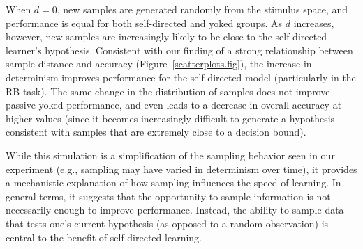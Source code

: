 \documentclass[3p,twocolumn,authoryear,10pt]{elsarticle}
\begin{document}
When $d=0$, new samples are generated randomly from the stimulus space, and performance is equal for both self-directed and yoked groups. As $d$ increases, however, new samples are increasingly likely to be close to the self-directed learner's hypothesis. Consistent with our finding of a strong relationship between sample distance and accuracy (Figure~\ref{scatterplots.fig}), the increase in determinism improves performance for the self-directed model (particularly in the RB task). The same change in the distribution of samples does not improve passive-yoked performance, and even leads to a decrease in overall accuracy at higher values (since it becomes increasingly difficult to generate a hypothesis consistent with samples that are extremely close to a decision bound). 

While this simulation is a simplification of the sampling behavior seen in our experiment (e.g., sampling may have varied in determinism over time), it provides a mechanistic explanation of how sampling influences the speed of learning. 
In general terms, it suggests that the opportunity to sample information is not necessarily enough to improve performance. Instead, the ability to sample data that tests one's current hypothesis (as opposed to a random observation) is central to the benefit of self-directed learning.



\end{document}
